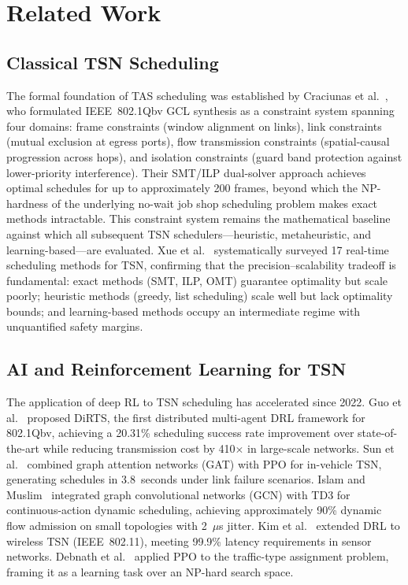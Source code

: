 \documentclass[conference]{IEEEtran}
\begin{document}
\section{Related Work}

\subsection{Classical TSN Scheduling}

The formal foundation of TAS scheduling was established by Craciunas et al.~\cite{craciunas2016smt}, who formulated IEEE~802.1Qbv GCL synthesis as a constraint system spanning four domains: frame constraints (window alignment on links), link constraints (mutual exclusion at egress ports), flow transmission constraints (spatial-causal progression across hops), and isolation constraints (guard band protection against lower-priority interference). Their SMT/ILP dual-solver approach achieves optimal schedules for up to approximately 200 frames, beyond which the NP-hardness of the underlying no-wait job shop scheduling problem makes exact methods intractable. This constraint system remains the mathematical baseline against which all subsequent TSN schedulers---heuristic, metaheuristic, and learning-based---are evaluated. Xue et al.~\cite{xue2024survey} systematically surveyed 17 real-time scheduling methods for TSN, confirming that the precision--scalability tradeoff is fundamental: exact methods (SMT, ILP, OMT) guarantee optimality but scale poorly; heuristic methods (greedy, list scheduling) scale well but lack optimality bounds; and learning-based methods occupy an intermediate regime with unquantified safety margins.

\subsection{AI and Reinforcement Learning for TSN}

The application of deep RL to TSN scheduling has accelerated since 2022. Guo et al.~\cite{guo2024dirt} proposed DiRTS, the first distributed multi-agent DRL framework for 802.1Qbv, achieving a 20.31\% scheduling success rate improvement over state-of-the-art while reducing transmission cost by 410$\times$ in large-scale networks. Sun et al.~\cite{sun2024gatppo} combined graph attention networks (GAT) with PPO for in-vehicle TSN, generating schedules in 3.8~seconds under link failure scenarios. Islam and Muslim~\cite{islam2024gcntd3} integrated graph convolutional networks (GCN) with TD3 for continuous-action dynamic scheduling, achieving approximately 90\% dynamic flow admission on small topologies with 2~$\mu$s jitter. Kim et al.~\cite{kim2024drl} extended DRL to wireless TSN (IEEE~802.11), meeting 99.9\% latency requirements in sensor networks. Debnath et al.~\cite{debnath2025tta} applied PPO to the traffic-type assignment problem, framing it as a learning task over an NP-hard search space.
\end{document}
